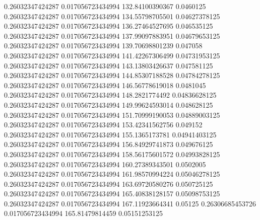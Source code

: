 0.26032347424287 0.017056723434994 132.84100390367 0.0460125
0.26032347424287 0.017056723434994 134.55798705501 0.04627378125
0.26032347424287 0.017056723434994 136.27464527695 0.046535125
0.26032347424287 0.017056723434994 137.99097883951 0.04679653125
0.26032347424287 0.017056723434994 139.70698801239 0.047058
0.26032347424287 0.017056723434994 141.42267306499 0.04731953125
0.26032347424287 0.017056723434994 143.13803426637 0.047581125
0.26032347424287 0.017056723434994 144.85307188528 0.04784278125
0.26032347424287 0.017056723434994 146.56778619018 0.0481045
0.26032347424287 0.017056723434994 148.2821774492 0.04836628125
0.26032347424287 0.017056723434994 149.99624593014 0.048628125
0.26032347424287 0.017056723434994 151.70999190053 0.04889003125
0.26032347424287 0.017056723434994 153.42341562756 0.049152
0.26032347424287 0.017056723434994 155.1365173781 0.04941403125
0.26032347424287 0.017056723434994 156.84929741873 0.049676125
0.26032347424287 0.017056723434994 158.56175601572 0.04993828125
0.26032347424287 0.017056723434994 160.27389343501 0.0502005
0.26032347424287 0.017056723434994 161.98570994224 0.05046278125
0.26032347424287 0.017056723434994 163.69720580276 0.050725125
0.26032347424287 0.017056723434994 165.40838128157 0.05098753125
0.26032347424287 0.017056723434994 167.11923664341 0.05125
0.26306685453726 0.017056723434994 165.81479814459 0.05151253125
